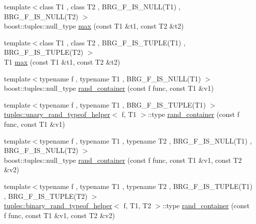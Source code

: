 \begin{DoxyCompactItemize}
\item 
{\footnotesize template$<$class T1 , class T2 , B\+R\+G\+\_\+\+F\+\_\+\+I\+S\+\_\+\+N\+U\+L\+L(\+T1) , B\+R\+G\+\_\+\+F\+\_\+\+I\+S\+\_\+\+N\+U\+L\+L(\+T2) $>$ }\\boost\+::tuples\+::null\+\_\+type \hyperlink{namespaceIceBRG_af8123f867f9a8c6a9703da8556182c84}{max} (const T1 \&t1, const T2 \&t2)
\item 
{\footnotesize template$<$class T1 , class T2 , B\+R\+G\+\_\+\+F\+\_\+\+I\+S\+\_\+\+T\+U\+P\+L\+E(\+T1) , B\+R\+G\+\_\+\+F\+\_\+\+I\+S\+\_\+\+T\+U\+P\+L\+E(\+T2) $>$ }\\T1 \hyperlink{namespaceIceBRG_a60b6b976c835b6e3bc8a6861f775cc64}{max} (const T1 \&t1, const T2 \&t2)
\item 
{\footnotesize template$<$typename f , typename T1 , B\+R\+G\+\_\+\+F\+\_\+\+I\+S\+\_\+\+N\+U\+L\+L(\+T1) $>$ }\\boost\+::tuples\+::null\+\_\+type \hyperlink{namespaceIceBRG_aea930a94516df403771b22be12d2637e}{rand\+\_\+container} (const f func, const T1 \&v1)
\item 
{\footnotesize template$<$typename f , typename T1 , B\+R\+G\+\_\+\+F\+\_\+\+I\+S\+\_\+\+T\+U\+P\+L\+E(\+T1) $>$ }\\\hyperlink{namespaceIceBRG_1_1tuples_structIceBRG_1_1tuples_1_1unary__rand__typeof__helper}{tuples\+::unary\+\_\+rand\+\_\+typeof\+\_\+helper}$<$ f, T1 $>$\+::type \hyperlink{namespaceIceBRG_a8f4b1d91ba4911195762ca81b1621a42}{rand\+\_\+container} (const f func, const T1 \&v1)
\item 
{\footnotesize template$<$typename f , typename T1 , typename T2 , B\+R\+G\+\_\+\+F\+\_\+\+I\+S\+\_\+\+N\+U\+L\+L(\+T1) , B\+R\+G\+\_\+\+F\+\_\+\+I\+S\+\_\+\+N\+U\+L\+L(\+T2) $>$ }\\boost\+::tuples\+::null\+\_\+type \hyperlink{namespaceIceBRG_a866a9fbc9ad826a9badb027b34381227}{rand\+\_\+container} (const f func, const T1 \&v1, const T2 \&v2)
\item 
{\footnotesize template$<$typename f , typename T1 , typename T2 , B\+R\+G\+\_\+\+F\+\_\+\+I\+S\+\_\+\+T\+U\+P\+L\+E(\+T1) , B\+R\+G\+\_\+\+F\+\_\+\+I\+S\+\_\+\+T\+U\+P\+L\+E(\+T2) $>$ }\\\hyperlink{namespaceIceBRG_1_1tuples_structIceBRG_1_1tuples_1_1binary__rand__typeof__helper}{tuples\+::binary\+\_\+rand\+\_\+typeof\+\_\+helper}$<$ f, T1, T2 $>$\+::type \hyperlink{namespaceIceBRG_afdc9f858c86c14286f32fbf3854be88f}{rand\+\_\+container} (const f func, const T1 \&v1, const T2 \&v2)
\item 

\end{DoxyCompactItemize}
